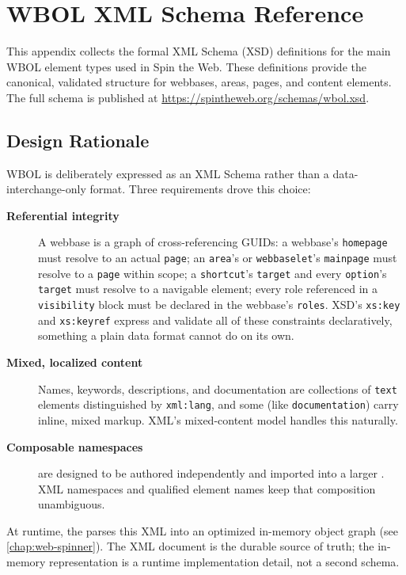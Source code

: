 \chapter{WBOL XML Schema Reference}
\label{app:wbol-xml-schema}

This appendix collects the formal XML Schema (XSD) definitions for the main WBOL element types used in Spin the Web. These definitions provide the canonical, validated structure for webbases, areas, pages, and content elements. The full schema is published at \url{https://spintheweb.org/schemas/wbol.xsd}.

\section{Design Rationale}
\label{sec:xsd-rationale}

WBOL is deliberately expressed as an XML Schema rather than a data-interchange-only format. Three requirements drove this choice:

\begin{description}
  \item[\textbf{Referential integrity}] A webbase is a graph of cross-referencing GUIDs: a webbase's \texttt{homepage} must resolve to an actual \texttt{page}; an \texttt{area}'s or \texttt{webbaselet}'s \texttt{mainpage} must resolve to a \texttt{page} within scope; a \texttt{shortcut}'s \texttt{target} and every \texttt{option}'s \texttt{target} must resolve to a navigable element; every role referenced in a \texttt{visibility} block must be declared in the webbase's \texttt{roles}. XSD's \texttt{xs:key} and \texttt{xs:keyref} express and validate all of these constraints declaratively, something a plain data format cannot do on its own.
  \item[\textbf{Mixed, localized content}] Names, keywords, descriptions, and documentation are collections of \texttt{text} elements distinguished by \texttt{xml:lang}, and some (like \texttt{documentation}) carry inline, mixed markup. XML's mixed-content model handles this naturally.
  \item[\textbf{Composable namespaces}]  are designed to be authored independently and imported into a larger \webbase{}. XML namespaces and qualified element names keep that composition unambiguous.
\end{description}

At runtime, the \webspinner{} parses this XML into an optimized in-memory object graph (see \cref{chap:web-spinner}). The XML document is the durable source of truth; the in-memory representation is a runtime implementation detail, not a second schema.

